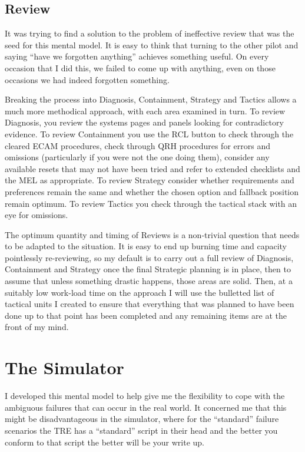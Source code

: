 \documentclass[a5paper,11pt,titlepage]{article}
\begin{document}
\subsection{Review}

It was trying to find a solution to the problem of ineffective review
that was the seed for this mental model. It is easy to think that
turning to the other pilot and saying ``have we forgotten anything''
achieves something useful. On every occasion that I did this, we failed
to come up with anything, even on those occasions we had indeed
forgotten something.

Breaking the process into Diagnosis, Containment, Strategy and Tactics
allows a much more methodical approach, with each area examined in turn.
To review Diagnosis, you review the systems pages and panels looking for
contradictory evidence. To review Containment you use the RCL button to
check through the cleared ECAM procedures, check through QRH procedures
for errors and omissions (particularly if you were not the one doing
them), consider any available resets that may not have been tried and
refer to extended checklists and the MEL as appropriate. To review
Strategy consider whether requirements and preferences remain the same
and whether the chosen option and fallback position remain optimum. To
review Tactics you check through the tactical stack with an eye for
omissions.

The optimum quantity and timing of Reviews is a non-trivial question
that needs to be adapted to the situation. It is easy to end up burning
time and capacity pointlessly re-reviewing, so my default is to carry
out a full review of Diagnosis, Containment and Strategy once the final
Strategic planning is in place, then to assume that unless something
drastic happens, those areas are solid. Then, at a suitably low
work-load time on the approach I will use the bulletted list of tactical
units I created to ensure that everything that was planned to have been
done up to that point has been completed and any remaining items are at
the front of my mind.

\section{The Simulator}

I developed this mental model to help give me the flexibility to cope
with the ambiguous failures that can occur in the real world. It
concerned me that this might be disadvantageous in the simulator, where
for the ``standard'' failure scenarios the TRE has a ``standard'' script
in their head and the better you conform to that script the better will
be your write up.
\end{document}
